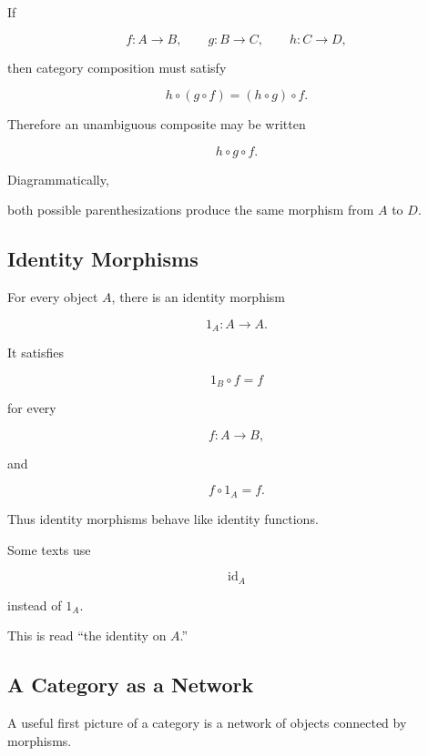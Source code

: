 If

\[ f:A\to B,\qquad g:B\to C,\qquad h:C\to D, \]

then category composition must satisfy

\[ h\circ(g\circ f)=(h\circ g)\circ f. \]

Therefore an unambiguous composite may be written

\[ h\circ g\circ f. \]

Diagrammatically,

\begin{center}
\end{center}

both possible parenthesizations produce the same morphism from \(A\) to
\(D\).

\subsection{Identity Morphisms}
\label{subsec:identity-morphisms}

For every object \(A\), there is an identity morphism

\[ 1_A:A\to A. \]

It satisfies

\[ 1_B\circ f=f \]

for every

\[ f:A\to B, \]

and

\[ f\circ1_A=f. \]

Thus identity morphisms behave like identity functions.

Some texts use

\[ \operatorname{id}_A \]

instead of \(1_A\).

This is read ``the identity on \(A\).''

\subsection{A Category as a Network}
\label{subsec:category-network}

A useful first picture of a category is a network of objects connected by
morphisms.

